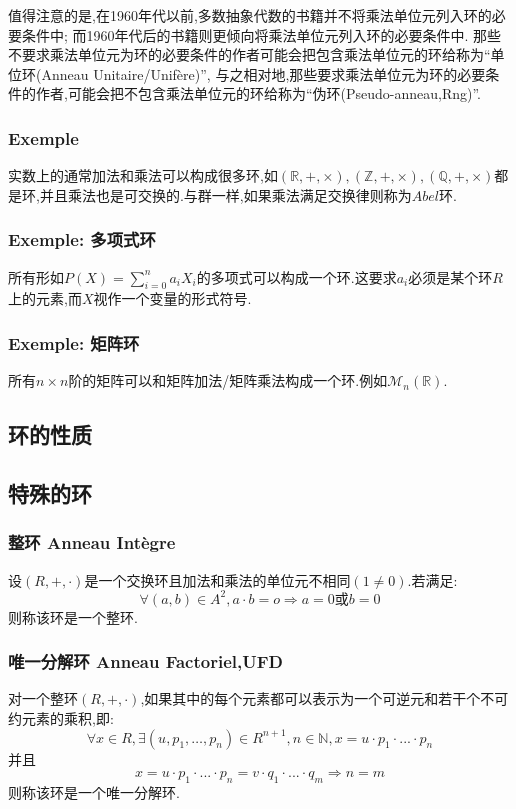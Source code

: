 \documentclass[12pt, a4paper, oneside]{ctexbook}
\begin{document}
  \indent
  值得注意的是,在1960年代以前,多数抽象代数的书籍并不将乘法单位元列入环的必要条件中;
  而1960年代后的书籍则更倾向将乘法单位元列入环的必要条件中.
  那些不要求乘法单位元为环的必要条件的作者可能会把包含乘法单位元的环给称为“单位环(Anneau Unitaire/Unifère)”,
  与之相对地,那些要求乘法单位元为环的必要条件的作者,可能会把不包含乘法单位元的环给称为“伪环(Pseudo-anneau,Rng)”.
  \subsubsection{Exemple}
  实数上的通常加法和乘法可以构成很多环,如$(\mathbb{R},+,\times),(\mathbb{Z},+,\times),(\mathbb{Q},+,\times)$都是环,并且乘法也是可交换的.与群一样,如果乘法满足交换律则称为$Abel$环.
  \subsubsection{Exemple: 多项式环}
  所有形如$P(X)=\sum_{i=0}^{n}a_iX_i $的多项式可以构成一个环.这要求$a_i$必须是某个环$R$上的元素,而$X$视作一个变量的形式符号.
  \subsubsection{Exemple: 矩阵环}
  所有$n\times n$阶的矩阵可以和矩阵加法/矩阵乘法构成一个环.例如$\mathcal{M}_n(\mathbb{R})$.
  \subsection{环的性质}

  \subsection{特殊的环}
  \subsubsection{整环 Anneau Intègre}
  设$(R,+,\cdot)$是一个交换环且加法和乘法的单位元不相同$(1\neq 0)$.若满足:
  $$
  \forall (a,b)\in A^2,a\cdot b=o\Rightarrow a=0\text{或}b=0
  $$则称该环是一个整环.
  \subsubsection{唯一分解环 Anneau Factoriel,UFD}
  对一个整环$(R,+,\cdot)$,如果其中的每个元素都可以表示为一个可逆元和若干个不可约元素的乘积,即:
  $$
  \forall x\in R,\exists (u,p_1,\dots,p_n)\in R^{n+1},n\in \mathbb{N},x=u\cdot p_1\cdot...\cdot p_n
  $$
  并且
  $$
  x=u\cdot p_1\cdot...\cdot p_n=v\cdot q_1\cdot...\cdot q_m\Rightarrow n=m
  $$
  则称该环是一个唯一分解环.
\end{document}
